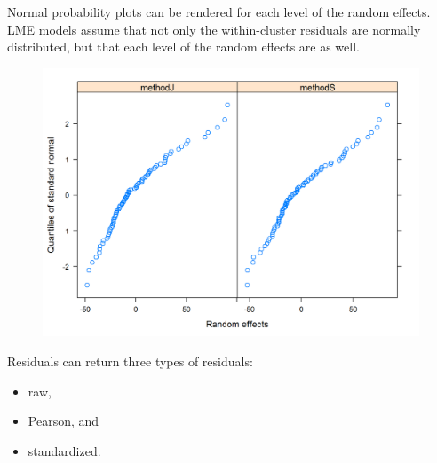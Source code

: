 \documentclass[12pt, a4paper]{report}
\theoremstyle{plain}
\theoremstyle{definition}
\theoremstyle{remark}
\begin{document}
	Normal probability plots can be rendered for each level of the random effects.  LME models assume that not only the within-cluster residuals are normally distributed, but that each level of the random effects are as well. %
	\begin{figure}[h!]
		\centering
		\includegraphics[width=0.9\linewidth]{images/ResidPlot2}
		\caption{}
		\label{fig:ResidPlot2}
	\end{figure}


Residuals can return three types of residuals:
\begin{itemize} 
	\item raw, 
	\item Pearson, and 
	\item standardized.\end{itemize} 



%
%
%
%
\end{document}
